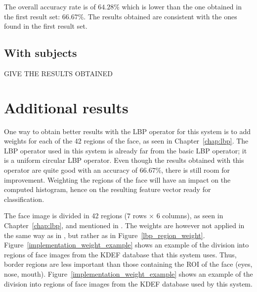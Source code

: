 \noindent The overall accuracy rate is of $ 64.28\% $ which is lower than the one obtained in the first result set: $ 66.67\% $. The results obtained are consistent with the ones found in the first result set.
\newline

\subsection{With subjects}

\vspace{\baselineskip}
\noindent GIVE THE RESULTS OBTAINED
\newline

\section{Additional results}

\vspace{\baselineskip}
\noindent One way to obtain better results with the LBP operator for this system is to add weights for each of the 42 regions of the face, as seen in Chapter~\ref{chap:lbp}. The LBP operator used in this system is already far from the basic LBP operator; it is a uniform circular LBP operator. Even though the results obtained with this operator are quite good with an accuracy of $ 66.67\% $, there is still room for improvement. Weighting the regions of the face will have an impact on the computed histogram, hence on the resulting feature vector ready for classification. \newline

\noindent The face image is divided in 42 regions ($ 7 $ rows $\times$ $ 6 $ columns), as seen in Chapter~\ref{chap:lbp}, and mentioned in \cite{GAN08}. The weights are however not applied in the same way as in \cite{GAN08}, but rather as in Figure~\ref{lbp_region_weight}. Figure~\ref{implementation_weight_example} shows an example of the division into regions of face images from the KDEF database that this system uses. Thus, border regions are less important than those containing the ROI of the face (eyes, nose, mouth). Figure~\ref{implementation_weight_example} shows an example of the division into regions of face images from the KDEF database used by this system.
\newline


